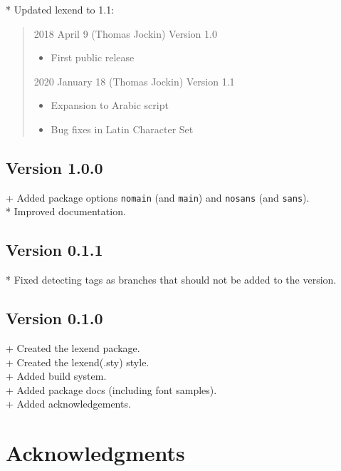 \documentclass[oneside,a4paper]{l3doc}
\providecommand{\tightlist}{%
  \setlength{\itemsep}{0pt}\setlength{\parskip}{0pt}}
\begin{document}
* Updated lexend to 1.1:

\begin{quote}
2018 April 9 (Thomas Jockin) Version 1.0

\begin{itemize}
\tightlist
\item
  First public release
\end{itemize}

2020 January 18 (Thomas Jockin) Version 1.1

\begin{itemize}
\tightlist
\item
  Expansion to Arabic script
\item
  Bug fixes in Latin Character Set
\end{itemize}
\end{quote}

\hypertarget{version-1.0.0}{%
\subsection*{Version 1.0.0}\label{version-1.0.0}}

+ Added package options \texttt{nomain} (and \texttt{main}) and \texttt{nosans} (and
\texttt{sans}).\\
* Improved documentation.

\hypertarget{version-0.1.1}{%
\subsection*{Version 0.1.1}\label{version-0.1.1}}

* Fixed detecting tags as branches that should not be added to the version.

\hypertarget{version-0.1.0}{%
\subsection*{Version 0.1.0}\label{version-0.1.0}}

+ Created the lexend package.\\
+ Created the lexend(.sty) style.\\
+ Added build system.\\
+ Added package docs (including font samples).\\
+ Added acknowledgements.

\section{Acknowledgments}
\end{document}
